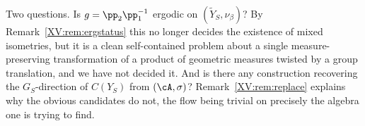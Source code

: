 Two questions. Is $g=\pp_2\pp_1^{-1}$ ergodic on $(\widetilde Y_S,\nu_\beta)$? By
Remark~\ref{XV:rem:ergstatus} this no longer decides the existence of mixed isometries, but it
is a clean self-contained problem about a single measure-preserving transformation of a
product of geometric measures twisted by a group translation, and we have not decided it.
And is there any construction recovering
the $G_S$-direction of $C(Y_S)$ from $(\cA,\sigma)$? Remark~\ref{XV:rem:replace} explains why the
obvious candidates do not, the flow being trivial on precisely the algebra one is trying to
find.

